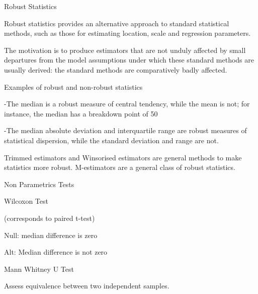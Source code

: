 
Robust Statistics

Robust statistics provides an alternative approach to standard statistical methods, such as those for estimating location, scale and regression parameters. 


The motivation is to produce estimators that are not unduly affected by small departures from the model assumptions under which these standard methods are usually derived: the standard methods are comparatively badly affected.


Examples of robust and non-robust statistics

 -The median is a robust measure of central tendency, while the mean is not; for instance, the median has a breakdown point of 50%

 -The median absolute deviation and interquartile range are robust measures of statistical dispersion, while the standard deviation and range are not.

 

Trimmed estimators and Winsorised estimators are general methods to make statistics more robust. M-estimators are a general class of robust statistics.


Non Parametrics Tests


Wilcoxon Test 


(corresponds to paired t-test) 


Null: median difference is zero

Alt: Median difference is not zero


Mann Whitney U Test

Assess equivalence between two independent samples.

